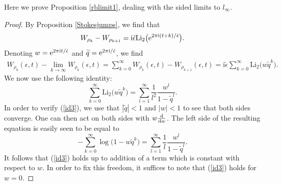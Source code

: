\documentclass[pdftex]{sigma}
\numberwithin{equation}{section}
\begin{document}
Here we prove Proposition \ref{rblimit1}, dealing with the sided limits to $l_{\infty}$.
\begin{proof}
By Proposition \ref{Stokesjumps}, we find that
\begin{equation*}
 W_{\rho_k}-W_{\rho_{k+1}}=\mathrm{i}\check\epsilon \mathrm{Li}_2\big({\rm e}^{2\pi \mathrm{i}(t+k)/\check \epsilon}\big).
\end{equation*}
Denoting $w={\rm e}^{2\pi \mathrm it/\check{\epsilon}}$ and $\widetilde{q}={\rm e}^{2\pi \mathrm{i}/\check{\epsilon}}$, we find
\begin{gather*}
 W_{\rho_0}(\epsilon,t)-\lim_{k\to \infty}W_{\rho_k}(\epsilon,t) =\sum_{k=0}^{\infty}W_{\rho_k}(\epsilon,t)-W_{\rho_{k+1}}(\epsilon,t)
 =\mathrm{i}\check\epsilon\sum_{k=0}^{\infty}\mathrm{Li}_2\big(w\widetilde{q}^k\big).
 \end{gather*}
We now use the following identity:
\begin{equation}
\sum_{k=0}^\infty \mathrm{Li}_2\big(w\widetilde{q}^k\big)=\sum_{l=1}^\infty\frac{1}{l^2}\frac{w^l}{1-\widetilde{q}^l}.
\label{id3}
\end{equation}
 In order to verify (\ref{id3}), we use that $|\widetilde{q}|<1$ and $|w|<1$ to see that both sides converge. One can then act on both sides with $w\frac{{\rm d}}{{\rm d}w}$.
The left side of the resulting equation is easily seen to be equal to
\[
-\sum_{k=0}^\infty\log\big(1-w\widetilde{q}^k\big)=\sum_{l=1}^\infty\frac{1}{l}\frac{w^l}{1-\widetilde{q}^l}.
\]
It follows that (\ref{id3}) holds up to addition of a term which is
constant with respect to $w$. In order to fix this freedom, it
suffices to note that (\ref{id3}) holds for $w=0$.


\end{proof}
\end{document}
